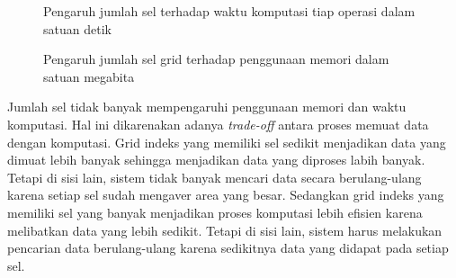 \documentclass[conference]{IEEEtran}
\begin{document}
\begin{figure}
	\centering
	\caption{Pengaruh jumlah sel terhadap waktu komputasi tiap operasi dalam satuan detik}\label{fig:uji-g}
\end{figure}

\begin{figure}
	\centering
	\caption{Pengaruh jumlah sel grid terhadap penggunaan memori dalam satuan megabita}\label{fig:uji-g-mem}
\end{figure}

Jumlah sel tidak banyak mempengaruhi penggunaan memori dan waktu komputasi. Hal ini dikarenakan adanya \textit{trade-off} antara proses memuat data dengan komputasi. Grid indeks yang memiliki sel sedikit menjadikan data yang dimuat lebih banyak sehingga menjadikan data yang diproses labih banyak. Tetapi di sisi lain, sistem tidak banyak mencari data secara berulang-ulang karena setiap sel sudah mengaver area yang besar. Sedangkan grid indeks yang memiliki sel yang banyak menjadikan proses komputasi lebih efisien karena melibatkan data yang lebih sedikit. Tetapi di sisi lain, sistem harus melakukan pencarian data berulang-ulang karena sedikitnya data yang didapat pada setiap sel.
\end{document}
